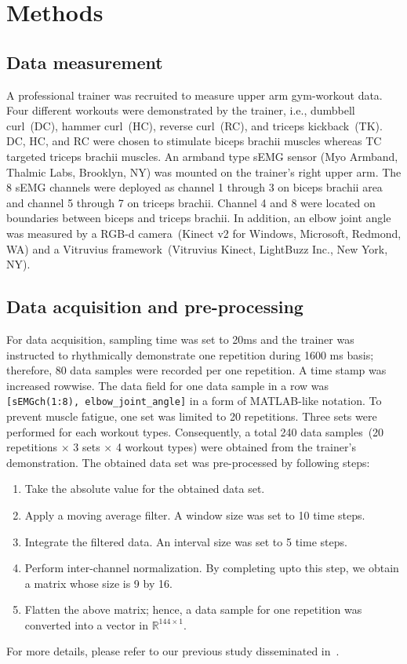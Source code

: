 \documentclass{ISIS}
\begin{document}
\section{Methods}

\subsection{Data measurement}
A professional trainer was recruited to measure upper arm gym-workout data. Four different workouts were demonstrated by the trainer, i.e., dumbbell curl~(DC), hammer curl~(HC), reverse curl~(RC), and triceps kickback~(TK). DC, HC, and RC were chosen to stimulate biceps brachii muscles whereas TC targeted triceps brachii muscles. An armband type sEMG sensor (Myo Armband, Thalmic Labs, Brooklyn, NY) was mounted on the trainer's right upper arm. The 8 sEMG channels were deployed as channel 1 through 3 on biceps brachii area and channel 5 through 7 on triceps brachii. Channel 4 and 8 were located on boundaries between biceps and triceps brachii. In addition, an elbow joint angle was measured by a RGB-d camera~(Kinect v2 for Windows, Microsoft, Redmond, WA) and a Vitruvius framework~(Vitruvius Kinect, LightBuzz Inc., New York, NY). 

\subsection{Data acquisition and pre-processing}
For data acquisition, sampling time was set to 20ms and the trainer was instructed to rhythmically demonstrate one repetition during 1600 ms basis; therefore, 80 data samples were recorded per one repetition. A time stamp was increased rowwise. The data field for one data sample in a row was {\texttt{[sEMGch(1:8), elbow\_joint\_angle]}} in a form of MATLAB-like notation. To prevent muscle fatigue, one set was limited to 20 repetitions. Three sets were performed for each workout types. Consequently, a total 240 data samples~(20 repetitions $\times$ 3 sets $\times$ 4 workout types) were obtained from the trainer's demonstration. The obtained data set was pre-processed by following steps:
\begin{enumerate}
	\item Take the absolute value for the obtained data set.
	\item Apply a moving average filter. A window size was set to 10 time steps.
	\item Integrate the filtered data. An interval size was set to 5 time steps.
	\item Perform inter-channel normalization. By completing upto this step, we obtain a matrix whose size is 9 by 16.
	\item Flatten the above matrix; hence, a data sample for one repetition was converted into a vector in $\mathbb{R}^{144 \times 1}$. 
\end{enumerate}  
For more details, please refer to our previous study disseminated in~\cite{JHYoo}.
\end{document}
